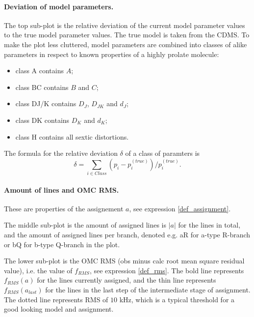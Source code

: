 \documentclass[11pt]{article}
\begin{document}
\paragraph{Deviation of model parameters.}
    The top sub-plot is the relative deviation of the current model parameter values to the true model parameter values. The true model is taken from the CDMS. To make the plot less cluttered, model parameters are combined into classes of alike parameters in respect to known properties of a highly prolate molecule:
    \begin{itemize}
        \item class A contains $A$;
        \item class BC contains $B$ and $C$;
        \item class DJ/K contains $D_J$, $D_{JK}$ and $d_J$;
        \item class DK contains $D_K$ and $d_K$;
        \item class H contains all sextic distortions.
    \end{itemize}
    The formula for the relative deviation $\delta$ of a class of paramters is
    \begin{equation}
        \delta = \sum_{i \in Class} (p_i - p^{(true)}_i) / p^{(true)}_i.
    \end{equation}
    
\paragraph{Amount of lines and OMC RMS.} These are properties of the assignement $a$, see expression \ref{def_assignment}.

    The middle sub-plot is the amount of assigned lines is $|a|$ for the lines in total, and the amount of assigned lines per branch, denoted e.g. aR for a-type R-branch or bQ for b-type Q-branch in the plot.
    
    The lower sub-plot is the OMC RMS (obs minus calc root mean square residual value), i.e. the value of $f_{RMS}$, see expression \ref{def_rms}. The bold line represents $f_{RMS}(a)$ for the lines currently assigned, and the thin line represents $f_{RMS}(a_{last})$ for the lines in the last step of the intermediate stage of assignment. The dotted line represents RMS of $10$ kHz, which is a typical threshold for a good looking model and assignment.
\end{document}
